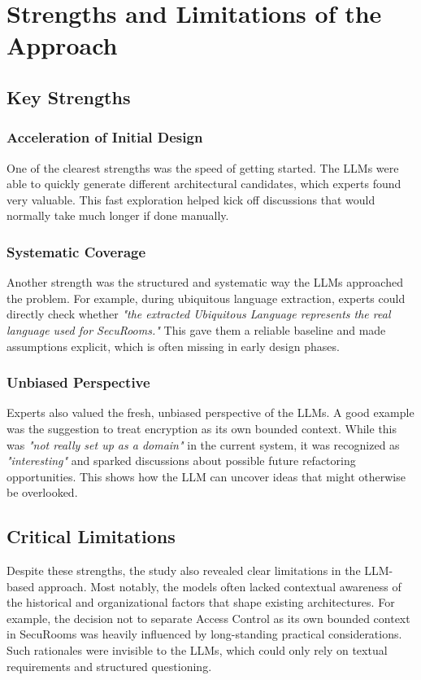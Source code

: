 \section{Strengths and Limitations of the Approach}

\subsection{Key Strengths}

\subsubsection{Acceleration of Initial Design}
One of the clearest strengths was the speed of getting started. The LLMs were able to quickly generate different architectural candidates, which experts found very valuable. This fast exploration helped kick off discussions that would normally take much longer if done manually.

\subsubsection{Systematic Coverage}
Another strength was the structured and systematic way the LLMs approached the problem. For example, during ubiquitous language extraction, experts could directly check whether \textit{"the extracted Ubiquitous Language represents the real language used for SecuRooms."} This gave them a reliable baseline and made assumptions explicit, which is often missing in early design phases.

\subsubsection{Unbiased Perspective}
Experts also valued the fresh, unbiased perspective of the LLMs. A good example was the suggestion to treat encryption as its own bounded context. While this was \textit{"not really set up as a domain"} in the current system, it was recognized as \textit{"interesting"} and sparked discussions about possible future refactoring opportunities. This shows how the LLM can uncover ideas that might otherwise be overlooked.

\subsection{Critical Limitations}

Despite these strengths, the study also revealed clear limitations in the LLM-based approach. Most notably, the models often lacked contextual awareness of the historical and organizational factors that shape existing architectures. For example, the decision not to separate Access Control as its own bounded context in SecuRooms was heavily influenced by long-standing practical considerations. Such rationales were invisible to the LLMs, which could only rely on textual requirements and structured questioning.


